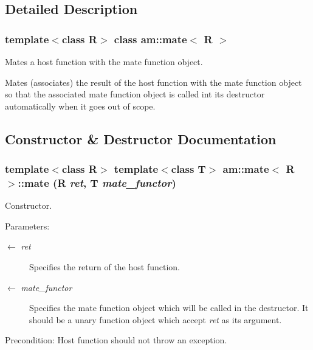 \subsection{Detailed Description}
\subsubsection*{template$<$class R$>$ class am::mate$<$ R $>$}

Mates a host function with the mate function object. 

Mates (associates) the result of the host function with the mate function object so that the associated mate function object is called int its destructor automatically when it goes out of scope. 



\subsection{Constructor \& Destructor Documentation}
\subsubsection{\setlength{\rightskip}{0pt plus 5cm}template$<$class R$>$ template$<$class T$>$ {\bf am::mate}$<$ R $>$::{\bf mate} (R {\em ret}, T {\em mate\_\-functor})\hspace{0.3cm}{\tt  [inline]}}\label{classam_1_1mate_52e89c5bf178aff995128a241fc6c3cc}


Constructor.

\begin{Desc}
\item[Parameters:]
\begin{description}
\item[\mbox{$\leftarrow$} {\em ret}]Specifies the return of the host function. \item[\mbox{$\leftarrow$} {\em mate\_\-functor}]Specifies the mate function object which will be called in the destructor. It should be a unary function object which accept {\em ret\/} as its argument.\end{description}
\end{Desc}
\begin{Desc}
\item[Precondition:]Host function should not throw an exception. \end{Desc}
